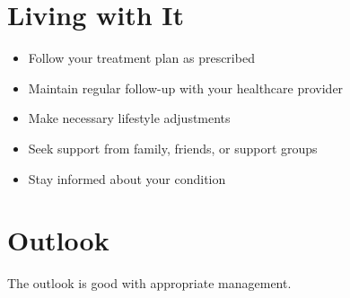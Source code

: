 \section{Living with It}
\begin{itemize}[noitemsep]
  \item Follow your treatment plan as prescribed
  \item Maintain regular follow-up with your healthcare provider
  \item Make necessary lifestyle adjustments
  \item Seek support from family, friends, or support groups
  \item Stay informed about your condition
\end{itemize}
\section{Outlook}
The outlook is good with appropriate management.
